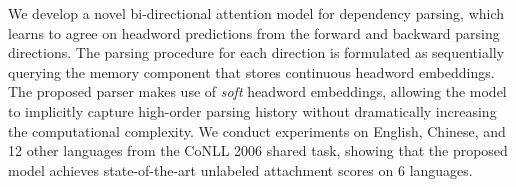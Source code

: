We develop a novel bi-directional attention model for dependency parsing, which learns to agree on headword predictions from the forward and backward parsing directions.             The parsing procedure for each direction is formulated as sequentially querying                   the memory component that stores continuous headword embeddings. The proposed parser makes use of {\it soft} headword embeddings, allowing the model to implicitly capture high-order parsing history without dramatically increasing the computational complexity.               We conduct experiments on English, Chinese, and 12 other languages from the CoNLL 2006 shared task, showing that the proposed model achieves state-of-the-art unlabeled attachment scores on 6 languages.
